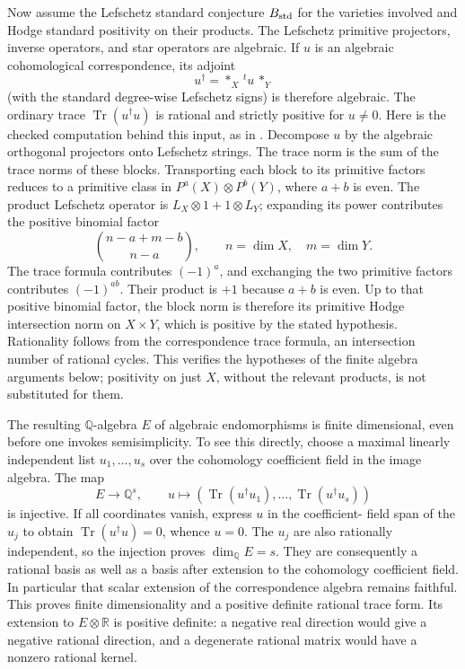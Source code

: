 Now assume the Lefschetz standard conjecture $B_{\rm std}$ for the
varieties involved and Hodge standard positivity on their products.
The Lefschetz primitive projectors, inverse operators, and star
operators are algebraic. If $u$ is an algebraic cohomological
correspondence, its adjoint
\[
                  u^\dagger=*_{X}\,{}^t u\,*_{Y}
\]
(with the standard degree-wise Lefschetz signs) is therefore algebraic.
The ordinary trace $\operatorname{Tr}(u^\dagger u)$ is rational and
strictly positive for $u\ne0$. Here is the checked computation behind
this input, as in \citet[Theorem 3.11]{cyKleiman1968}.
Decompose $u$ by the algebraic orthogonal projectors onto Lefschetz
strings. The trace norm is the sum of the trace norms of these blocks.
Transporting each block to its primitive factors reduces to a
primitive class in $P^a(X)\otimes P^b(Y)$, where $a+b$ is even.
The product Lefschetz operator is $L_X\otimes1+1\otimes L_Y$;
expanding its power contributes the positive binomial factor
\[
                   \binom{n-a+m-b}{n-a},
                   \qquad n=\dim X,\quad m=\dim Y.
\]
The trace formula contributes $(-1)^a$, and exchanging the two
primitive factors contributes $(-1)^{ab}$. Their product is $+1$
because $a+b$ is even. Up to that positive binomial factor, the block
norm is therefore its primitive Hodge intersection norm on $X\times Y$,
which is positive by the stated hypothesis. Rationality follows from
the correspondence trace formula, an intersection number of rational
cycles. This verifies the hypotheses of the finite algebra arguments
below; positivity on just $X$, without the relevant products, is not
substituted for them.

The resulting $\mathbb Q$-algebra $E$ of algebraic endomorphisms is
finite dimensional, even before one invokes semisimplicity. To see
this directly, choose a maximal linearly independent list
$u_1,\ldots,u_s$ over the cohomology coefficient field in the image
algebra. The map
\[
 E\longrightarrow\mathbb Q^s,
 \qquad u\longmapsto
       (\operatorname{Tr}(u^\dagger u_1),\ldots,
                         \operatorname{Tr}(u^\dagger u_s))
\]
is injective. If all coordinates vanish, express $u$ in the coefficient-
field span of the $u_j$ to obtain
$\operatorname{Tr}(u^\dagger u)=0$, whence $u=0$.
The $u_j$ are also rationally independent, so the injection proves
$\dim_{\mathbb Q}E=s$. They are consequently a rational basis as well
as a basis after extension to the cohomology coefficient field.
In particular that scalar extension of the correspondence algebra
remains faithful. This proves finite dimensionality and a positive
definite rational trace form. Its extension to $E\otimes\mathbb R$ is positive definite:
a negative real direction would give a negative rational direction,
and a degenerate rational matrix would have a nonzero rational kernel.

